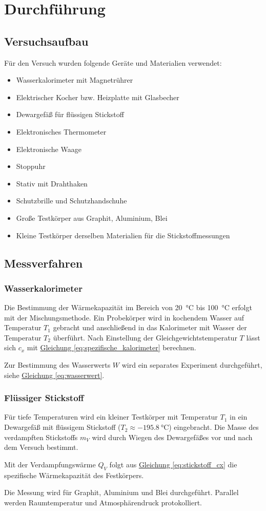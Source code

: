 \chapter{Durchführung}

\section{Versuchsaufbau}
Für den Versuch wurden folgende Geräte und Materialien verwendet:
\begin{itemize}
  \item Wasserkalorimeter mit Magnetrührer
  \item Elektrischer Kocher bzw. Heizplatte mit Glasbecher
  \item Dewargefäß für flüssigen Stickstoff
  \item Elektronisches Thermometer
  \item Elektronische Waage
  \item Stoppuhr
  \item Stativ mit Drahthaken
  \item Schutzbrille und Schutzhandschuhe
  \item Große Testkörper aus Graphit, Aluminium, Blei
  \item Kleine Testkörper derselben Materialien für die Stickstoffmessungen
\end{itemize}

\section{Messverfahren}
\subsection*{Wasserkalorimeter}
Die Bestimmung der Wärmekapazität im Bereich von \SI{20}{\celsius} bis \SI{100}{\celsius} erfolgt mit der Mischungsmethode.  
Ein Probekörper wird in kochendem Wasser auf Temperatur \(T_1\) gebracht und anschließend in das Kalorimeter mit Wasser der Temperatur \(T_2\) überführt. Nach Einstellung der Gleichgewichtstemperatur \(T\) lässt sich \(c_x\) mit \hyperref[eq:spezifische_kalorimeter]{Gleichung \ref*{eq:spezifische_kalorimeter}} berechnen.  

Zur Bestimmung des Wasserwerts \(W\) wird ein separates Experiment durchgeführt, siehe \hyperref[eq:wasserwert]{Gleichung \ref*{eq:wasserwert}}.

\subsection*{Flüssiger Stickstoff}
Für tiefe Temperaturen wird ein kleiner Testkörper mit Temperatur \(T_1\) in ein Dewargefäß mit flüssigem Stickstoff (\(T_2 \approx \SI{-195.8}{\celsius}\)) eingebracht. Die Masse des verdampften Stickstoffs \(m_V\) wird durch Wiegen des Dewargefäßes vor und nach dem Versuch bestimmt.  

Mit der Verdampfungswärme \(Q_V\) folgt aus \hyperref[eq:stickstoff_cx]{Gleichung \ref*{eq:stickstoff_cx}} die spezifische Wärmekapazität des Festkörpers.  

Die Messung wird für Graphit, Aluminium und Blei durchgeführt. Parallel werden Raumtemperatur und Atmosphärendruck protokolliert.